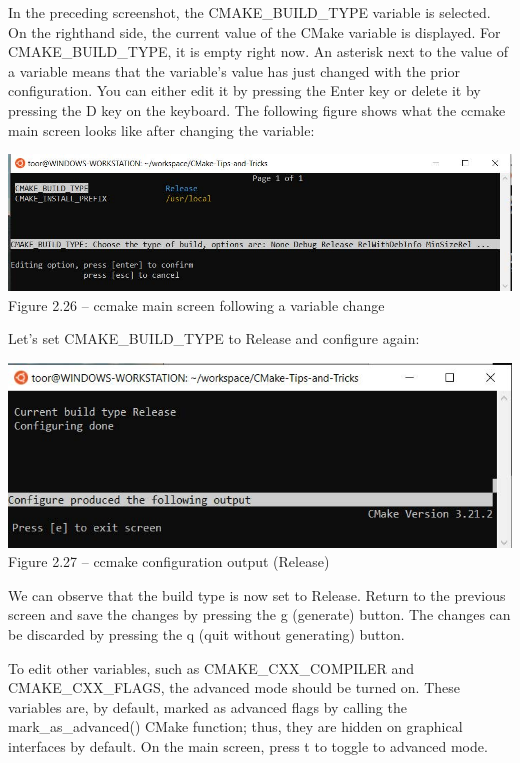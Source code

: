 In the preceding screenshot, the CMAKE\_BUILD\_TYPE variable is selected. On the righthand side, the current value of the CMake variable is displayed. For CMAKE\_BUILD\_TYPE, it is empty right now. An asterisk next to the value of a variable means that the variable's value has just changed with the prior configuration. You can either edit it by pressing the Enter key or delete it by pressing the D key on the keyboard. The following figure shows what the ccmake main screen looks like after changing the variable:

\begin{center}
\includegraphics[width=1.\textwidth]{content/1/chapter2/images/26.jpg}\\
Figure 2.26 – ccmake main screen following a variable change
\end{center}

Let's set CMAKE\_BUILD\_TYPE to Release and configure again:

\begin{center}
\includegraphics[width=1.\textwidth]{content/1/chapter2/images/27.jpg}\\
Figure 2.27 – ccmake configuration output (Release)
\end{center}

We can observe that the build type is now set to Release. Return to the previous screen and save the changes by pressing the g (generate) button. The changes can be discarded by pressing the q (quit without generating) button.

To edit other variables, such as CMAKE\_CXX\_COMPILER and CMAKE\_CXX\_FLAGS, the advanced mode should be turned on. These variables are, by default, marked as advanced flags by calling the mark\_as\_advanced() CMake function; thus, they are hidden on graphical interfaces by default. On the main screen, press t to toggle to advanced mode.

